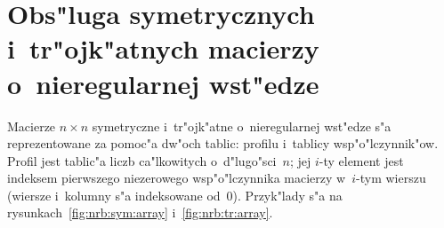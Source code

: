 \vspace{\bigskipamount}


\newpage
\section{\label{sect:nrb:sym:array}Obs"luga symetrycznych i~tr"ojk"atnych macierzy \\
o~nieregularnej wst"edze}

Macierze $n\times n$ symetryczne i~tr"ojk"atne o~nieregularnej wst"edze
s"a reprezentowane za pomoc"a dw"och tablic: profilu i~tablicy wsp"o"lczynnik"ow.
Profil jest tablic"a liczb ca"lkowitych o~d"lugo"sci~$n$; jej $i$-ty element
jest indeksem pierwszego niezerowego wsp"o"lczynnika macierzy w~$i$-tym wierszu
(wiersze i~kolumny s"a indeksowane od~$0$). Przyk"lady s"a na
rysunkach~\ref{fig:nrb:sym:array} i~\ref{fig:nrb:tr:array}.
